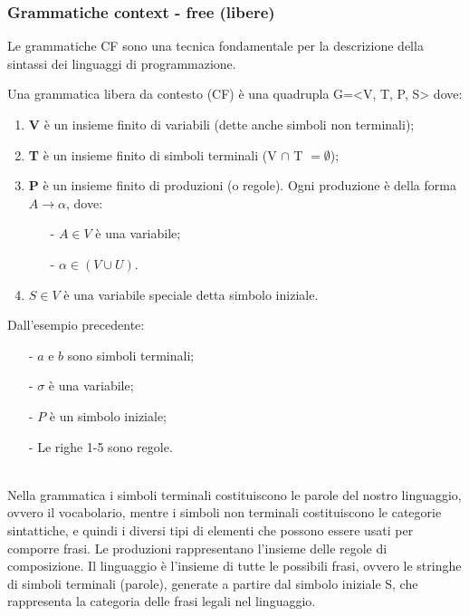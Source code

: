 \documentclass[a4paper, 10pt]{report}
\begin{document}
\subsubsection*{Grammatiche context - free (libere)}
Le grammatiche CF sono una tecnica fondamentale per la descrizione della sintassi dei linguaggi di programmazione.\\

\begin{tcolorbox}[title=\textbf{Definizione}]
Una grammatica libera da contesto (CF) è una quadrupla G=<V, T, P, S> dove:
\begin{enumerate}
\item \textbf{V} è un insieme finito di variabili (dette anche simboli non terminali);
\item \textbf{T} è un insieme finito di simboli terminali (V $\cap$ T $= \emptyset$);
\item \textbf{P} è un insieme finito di produzioni (o regole). Ogni produzione è della forma $A \rightarrow \alpha$, dove:
	\begin{itemize}
	\item[-] $A \in V$ è una variabile;
	\item[-] $\alpha \in (V \cup U)$.
	\end{itemize}
\item $S \in V$ è una variabile speciale detta simbolo iniziale.
\end{enumerate}

\noindent Dall'esempio precedente:
\begin{itemize}
\item[-] $a$ e $b$ sono simboli terminali;
\item[-] $\sigma$ è una variabile;
\item[-] $P$ è un simbolo iniziale;
\item[-] Le righe 1-5 sono regole.
\end{itemize}
\end{tcolorbox}

\noindent \\Nella grammatica i simboli terminali costituiscono le parole del   nostro   linguaggio,   ovvero   il   vocabolario,   mentre  i simboli non terminali   costituiscono le categorie sintattiche, e quindi i diversi tipi di elementi che possono essere usati  per  comporre  frasi.
Le produzioni rappresentano l'insieme delle regole di composizione. Il linguaggio  è  l’insieme  di  tutte  le  possibili  frasi,  ovvero  le stringhe di simboli terminali (parole), generate a partire dal simbolo  iniziale  S,  che  rappresenta  la  categoria  delle  frasi legali nel linguaggio.\\
\end{document}
